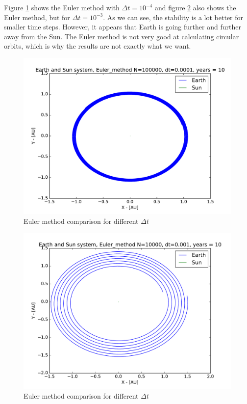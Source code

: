 \documentclass[12pt]{article}
\begin{document}
Figure \ref{fig:balle} shows the Euler method with $\Delta t = 10^{-4}$ and figure \ref{fig:balle1} also shows the Euler method, but for $\Delta t = 10^{-3}$. As we can see, the stability is a lot better for smaller time steps. However, it appears that Earth is going further and further away from the Sun. The Euler method is not very good at calculating circular orbits, which is why the results are not exactly what we want.
\begin{figure}[!h]
\centering
\includegraphics[width=\linewidth]{Plots/Earth_Sun_Euler_method.pdf}
\caption{Euler method comparison for different $\Delta t$}
\label{fig:balle}
\end{figure}
\begin{figure}[!h]
\centering
\includegraphics[width=\linewidth]{Plots/Earth_Sun_Euler_method_larger_dt.pdf}
\caption{Euler method comparison for different $\Delta t$}
\label{fig:balle1}
\end{figure}
\end{document}
